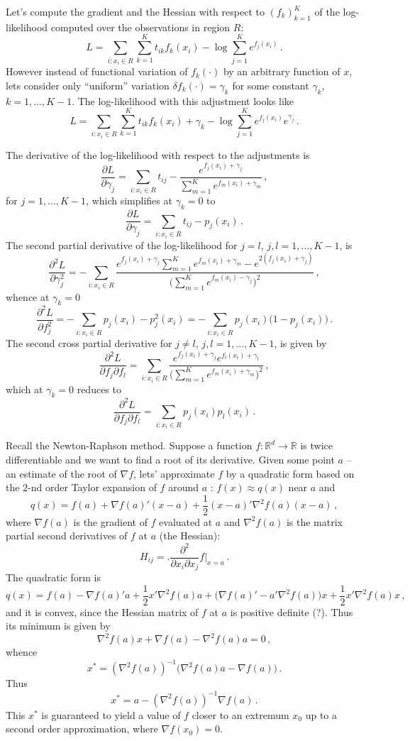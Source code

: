 \documentclass[a4paper]{article}
\newcommand{\Real}{\mathbb{R}}
\begin{document}
Let's compute the gradient and the Hessian with respect to $(f_k)_{k=1}^K$ of the
log-likelihood computed over the observations in region $R$:
\[ L = \sum_{i:x_i\in R} \sum_{k=1}^K t_{ik} f_k(x_i) - \log \sum_{j=1}^K e^{f_j(x_i)} \,. \]
However instead of functional variation of $f_k(\cdot)$ by an arbitrary function
of $x$, lets consider only ``uniform'' variation $\delta f_k(\cdot) = \gamma_k$ for
some constant $\gamma_k$, $k=1,\ldots, K-1$. The log-likelihood with this adjustment
looks like
\[
L = \sum_{i:x_i\in R} \sum_{k=1}^K t_{ik} f_k(x_i) + \gamma_k - \log \sum_{j=1}^K e^{f_j(x_i)}  e^{\gamma_j}\,.
\]

The derivative of the log-likelihood with respect to the adjustments is
\[
\frac{\partial L}{\partial \gamma_j}
= \sum_{i:x_i\in R} t_{ij} - \frac{e^{f_j(x_i)+\gamma_j}}{\sum_{m=1}^K e^{f_m(x_i)+\gamma_m}}\,,
\]
for $j=1,\ldots, K-1$, which simplifies at $\gamma_k = 0$ to 
\[ \frac{\partial L}{\partial \gamma_j} = \sum_{i:x_i\in R} t_{ij} - p_j(x_i)\,. \]
The second partial derivative of the log-likelihood for $j=l$, $j,l=1,\ldots, K-1$, is
\[
\frac{\partial^2 L}{\partial \gamma_j^2}
= - \sum_{i:x_i\in R} \frac{e^{f_j(x_i) + \gamma_j }\sum_{m=1}^K e^{f_m(x_i) + \gamma_m }
	- e^{2(f_j(x_i) + \gamma_j)} }{\bigl(\sum_{m=1}^K e^{f_m(x_i) - \gamma_j}\bigr)^2}\,,
\]
whence at $\gamma_k=0$
\[
\frac{\partial^2 L}{\partial f_j^2}
= - \sum_{i:x_i\in R} p_j(x_i) - p_j^2(x_i)
= - \sum_{i:x_i\in R} p_j(x_i) \bigl(1 - p_j(x_i)\bigr)\,.
\]
The second cross partial derivative for $j\neq l$, $j,l=1,\ldots, K-1$, is given by
\[
\frac{\partial^2 L}{\partial f_j \partial f_l}
= \sum_{i:x_i\in R} \frac{e^{f_j(x_i)+\gamma_j}e^{f_l(x_i)+\gamma_l}}{\bigl(\sum_{m=1}^K e^{f_m(x_i)+\gamma_m}\bigr)^2}\,,
\]
which at $\gamma_k=0$ reduces to
\[
\frac{\partial^2 L}{\partial f_j \partial f_l}
= \sum_{i:x_i\in R} p_j(x_i) p_l(x_i)\,.
\]

Recall the Newton-Raphson method. Suppose a function $f:\Real^d\to\Real$ is twice
differentiable and we want to find a root of its derivative. Given some point $a$
-- an estimate of the root of $\nabla f$, lets' approximate $f$ by a quadratic form
based on the $2$-nd order Taylor expansion of $f$ around $a$ : $f(x) \approx q(x)$
near $a$ and
\[
q(x) = f(a) + \nabla f(a)'(x-a) + \frac{1}{2}(x-a)'\nabla^2 f(a) (x-a)\,,
\]
where $\nabla f(a)$ is the gradient of $f$ evaluated at $a$ and $\nabla^2 f(a)$ is
the matrix partial second derivatives of $f$ at $a$ (the Hessian):
\[
H_{ij} = \biggl. \frac{\partial^2}{\partial x_i \partial x_j} f\biggr\rvert_{x=a}\,.
\]
The quadratic form is 
\[
q(x) = f(a) - \nabla f(a)'a + \frac{1}{2}x'\nabla^2 f(a) a
+ \bigl( \nabla f(a)' - a'\nabla^2 f(a) \bigr)x + \frac{1}{2}x'\nabla^2 f(a) x\,,
\]
and it is convex, since the Hessian matrix of $f$ at $a$ is positive definite (?).
Thus its minimum is given by
\[ \nabla^2 f(a) x + \nabla f(a) - \nabla^2 f(a) a = 0\,,\]
whence
\[ x^* = (\nabla^2 f(a))^{-1} \bigl( \nabla^2 f(a) a - \nabla f(a)\bigl)\,.\]
Thus
\[
x^* = a - (\nabla^2 f(a))^{-1}\nabla f(a)\,.
\]
This $x^*$ is guaranteed to yield a value of $f$ closer to an extremum $x_0$ up to a
second order approximation, where $\nabla f(x_0)=0$.
\end{document}
